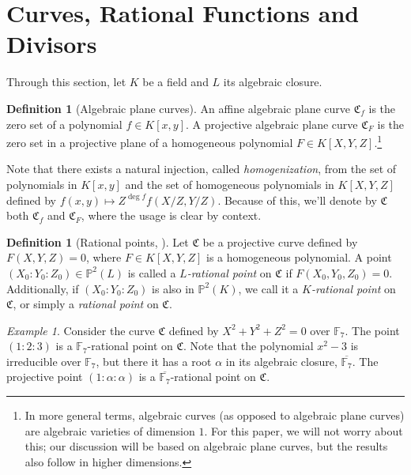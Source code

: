 \documentclass[11pt, oneside]{amsart}
\theoremstyle{definition}
\newtheorem{defn}[thm]{Definition}
\theoremstyle{remark}
\newtheorem*{exmp*}{Example}
\numberwithin{equation}{section}
\begin{document}
\section{Curves, Rational Functions and Divisors}

Through this section, let $K$ be a field and $L$ its algebraic closure.

\begin{defn}[Algebraic plane curves]
	An affine algebraic plane curve $\mathfrak C_f$ is the zero set of a polynomial $f \in K[x, y]$.
	A projective algebraic plane curve $\mathfrak C_F$ is the zero set in a projective plane of a homogeneous polynomial $F \in K[X, Y, Z]$.\footnote{In more general terms, algebraic curves (as opposed to algebraic plane curves) are algebraic varieties of dimension $1$. For this paper, we will not worry about this; our discussion will be based on algebraic plane curves, but the results also follow in higher dimensions.}
\end{defn}


Note that there exists a natural injection, called \emph{homogenization}, from the set of polynomials in $K[x, y]$ and the set of homogeneous polynomials in $K[X, Y, Z]$ defined by $f(x, y) \mapsto Z^{\deg f}f(X/Z, Y/Z)$.
Because of this, we'll denote by $\mathfrak C$ both $\mathfrak C_f$ and $\mathfrak C_F$, where the usage is clear by context.

\begin{defn}[Rational points, \cite{Wal00}] %
	Let $\mathfrak C$ be a projective curve defined by $F(X, Y, Z) = 0$, where $F \in K[X, Y, Z]$ is a homogeneous polynomial.
	A point $(X_0 : Y_0 : Z_0) \in \mathbb{P}^2(L)$ is called a \emph{$L$-rational point} on $\mathfrak C$ if $F(X_0, Y_0, Z_0) = 0$.
	Additionally, if $(X_0 : Y_0 : Z_0)$ is also in $\mathbb{P}^2(K)$, we call it a \emph{$K$-rational point} on $\mathfrak C$, or simply a \emph{rational point} on $\mathfrak C$.
\end{defn}

\begin{exmp*}
	Consider the curve $\mathfrak C$ defined by $X^2 + Y^2 + Z^2 = 0$ over $\mathbb{F}_7$.
	The point $(1 : 2 : 3)$ is a $\mathbb{F}_7$-rational point on $\mathfrak C$.
	Note that the polynomial $x^2 - 3$ is irreducible over $\mathbb{F}_7$, but there it has a root $\alpha$ in its algebraic closure, $\overline{\mathbb{F}_7}$. The projective point $(1 :  \alpha : \alpha)$ is a $\overline{\mathbb{F}_7}$-rational point on $\mathfrak C$.
\end{exmp*}
\end{document}
